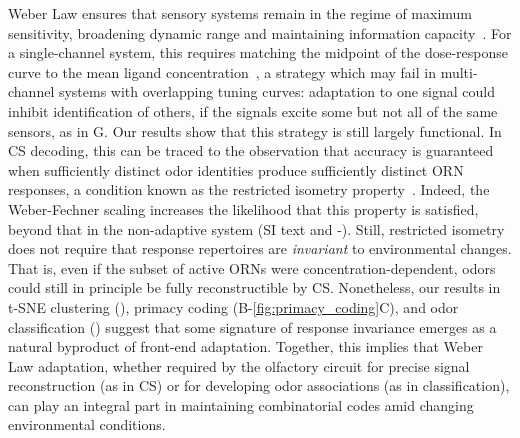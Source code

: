 \documentclass[9pt,lineno]{elife}
\begin{document}
Weber Law ensures that sensory systems remain in the regime of maximum sensitivity, broadening dynamic range and maintaining information capacity~\citep{adaptation_fairhall}.
For a single-channel system, this requires matching the midpoint of the dose-response curve to the mean ligand concentration~\citep{information_theory_adaptation}, a strategy which may fail in multi-channel systems with overlapping tuning curves: adaptation to one signal could inhibit identification of others, if the signals excite some but not all of the same sensors, as in G. 
Our results show that this strategy is still largely functional. In CS decoding, this can be traced to the observation that accuracy is guaranteed when sufficiently distinct odor identities produce sufficiently distinct ORN responses, a condition known as the restricted isometry property~\citep{CS_tao}. Indeed, the Weber-Fechner scaling increases the likelihood that this property  is satisfied, beyond that in the non-adaptive system (SI text and -). Still, restricted isometry does not require that response repertoires are \textit{invariant} to environmental changes. That is, even if the subset of active ORNs were concentration-dependent, odors could still in principle be fully reconstructible by CS. Nonetheless, our results in t-SNE clustering (), primacy coding  (B-\ref{fig:primacy_coding}C), and odor classification () suggest that some signature of response invariance emerges as a natural byproduct of front-end adaptation. Together, this implies that Weber Law adaptation, whether required by the olfactory circuit for precise signal reconstruction (as in CS) or for developing odor associations (as in classification), can play an integral part in maintaining combinatorial codes amid changing environmental conditions.

\end{document}
